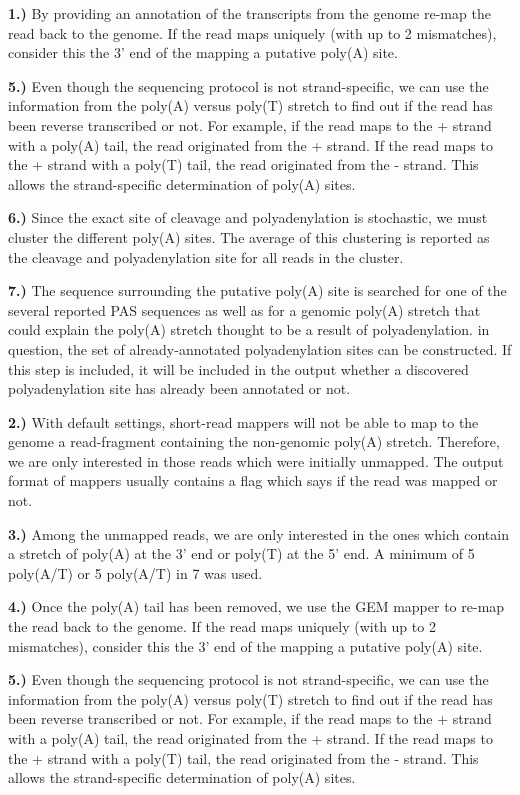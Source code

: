 \textbf{1.)} By providing an annotation of the transcripts from the genome
re-map the read back to the genome. If the read maps uniquely (with up to 2
mismatches), consider this the 3' end of the mapping a putative poly(A) site.

\textbf{5.)} Even though the sequencing protocol is not strand-specific, we can
use the information from the poly(A) versus poly(T) stretch to find out if the
read has been reverse transcribed or not. For example, if the read maps to the
+ strand with a poly(A) tail, the read originated from the + strand. If the
read maps to the + strand with a poly(T) tail, the read originated from the -
strand. This allows the strand-specific determination of poly(A) sites.

\textbf{6.)} Since the exact site of cleavage and polyadenylation is stochastic,
we must cluster the different poly(A) sites. The average of this clustering is
reported as the cleavage and polyadenylation site for all reads in the cluster.

\textbf{7.)} The sequence surrounding the putative poly(A) site is searched for
one of the several reported PAS sequences as well as for a genomic poly(A)
stretch that could explain the poly(A) stretch thought to be a result of
polyadenylation. in
question, the set of already-annotated polyadenylation sites can be
constructed. If this step is included, it will be included in the output
whether a discovered polyadenylation site has already been annotated or not.

\textbf{2.)} With default settings, short-read mappers will not be able to map
to the genome a read-fragment containing the non-genomic poly(A)
stretch. Therefore, we are only interested in those reads which were initially
unmapped. The output format of mappers usually contains a flag which says if
the read was mapped or not.

\textbf{3.)} Among the unmapped reads, we are only interested in the ones which
contain a stretch of poly(A) at the 3' end or poly(T) at the 5' end. A minimum
of 5 poly(A/T) or 5 poly(A/T) in 7 was used.

\textbf{4.)} Once the poly(A) tail has been removed, we use the GEM mapper to
re-map the read back to the genome. If the read maps uniquely (with up to 2
mismatches), consider this the 3' end of the mapping a putative poly(A) site.

\textbf{5.)} Even though the sequencing protocol is not strand-specific, we can
use the information from the poly(A) versus poly(T) stretch to find out if the
read has been reverse transcribed or not. For example, if the read maps to the
+ strand with a poly(A) tail, the read originated from the + strand. If the
read maps to the + strand with a poly(T) tail, the read originated from the -
strand. This allows the strand-specific determination of poly(A) sites.

